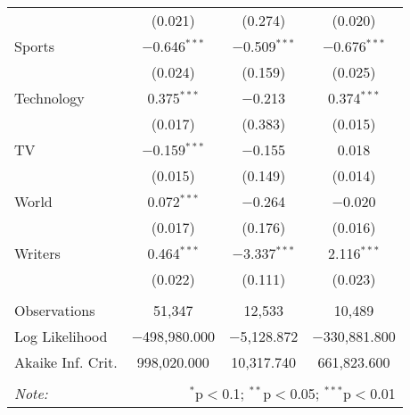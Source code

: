 \begin{table}[!htbp]
\begin{tabular}{@{\extracolsep{5pt}}lccc}
  & (0.021) & (0.274) & (0.020) \\ 
  Sports & $-$0.646$^{***}$ & $-$0.509$^{***}$ & $-$0.676$^{***}$ \\ 
  & (0.024) & (0.159) & (0.025) \\ 
  Technology & 0.375$^{***}$ & $-$0.213 & 0.374$^{***}$ \\ 
  & (0.017) & (0.383) & (0.015) \\ 
  TV & $-$0.159$^{***}$ & $-$0.155 & 0.018 \\ 
  & (0.015) & (0.149) & (0.014) \\ 
  World & 0.072$^{***}$ & $-$0.264 & $-$0.020 \\ 
  & (0.017) & (0.176) & (0.016) \\ 
  Writers & 0.464$^{***}$ & $-$3.337$^{***}$ & 2.116$^{***}$ \\ 
  & (0.022) & (0.111) & (0.023) \\ 
 \hline \\[-1.8ex] 
Observations & 51,347 & 12,533 & 10,489 \\ 
Log Likelihood & $-$498,980.000 & $-$5,128.872 & $-$330,881.800 \\ 
Akaike Inf. Crit. & 998,020.000 & 10,317.740 & 661,823.600 \\ 
\hline 
\hline \\[-1.8ex] 
\textit{Note:}  & \multicolumn{3}{r}{$^{*}$p$<$0.1; $^{**}$p$<$0.05; $^{***}$p$<$0.01} \\ 
\end{tabular} 
\end{table} 
